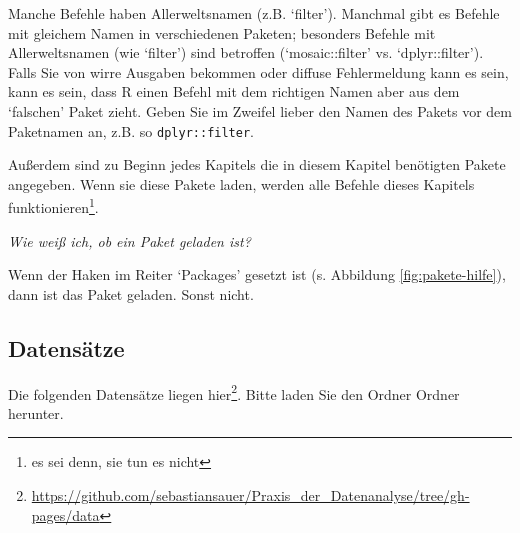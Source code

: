 \documentclass[12pt,ngerman,]{book}
\let\rmarkdownfootnote\footnote%
\def\footnote{\protect\rmarkdownfootnote}
\renewcommand{\href}[2]{#2\footnote{\url{#1}}}
\theoremstyle{definition}
\theoremstyle{definition}
\theoremstyle{remark}
\let\BeginKnitrBlock\begin \let\EndKnitrBlock\end
\begin{document}
\BeginKnitrBlock{rmdcaution}
Manche Befehle haben Allerweltsnamen (z.B. `filter'). Manchmal gibt es
Befehle mit gleichem Namen in verschiedenen Paketen; besonders Befehle
mit Allerweltsnamen (wie `filter') sind betroffen (`mosaic::filter' vs.
`dplyr::filter'). Falls Sie von wirre Ausgaben bekommen oder diffuse
Fehlermeldung kann es sein, kann es sein, dass R einen Befehl mit dem
richtigen Namen aber aus dem `falschen' Paket zieht. Geben Sie im
Zweifel lieber den Namen des Pakets vor dem Paketnamen an, z.B. so
\texttt{dplyr::filter}.
\EndKnitrBlock{rmdcaution}

Außerdem sind zu Beginn jedes Kapitels die in diesem Kapitel benötigten
Pakete angegeben. Wenn sie diese Pakete laden, werden alle Befehle
dieses Kapitels funktionieren\footnote{es sei denn, sie tun es nicht}.

\emph{Wie weiß ich, ob ein Paket geladen ist?}

Wenn der Haken im Reiter `Packages' gesetzt ist (s. Abbildung
\ref{fig:pakete-hilfe}), dann ist das Paket geladen. Sonst nicht.

\subsection{Datensätze}\label{daten}

Die folgenden Datensätze liegen
\href{https://github.com/sebastiansauer/Praxis_der_Datenanalyse/tree/gh-pages/data}{hier}.
Bitte laden Sie den Ordner Ordner herunter.
\end{document}
